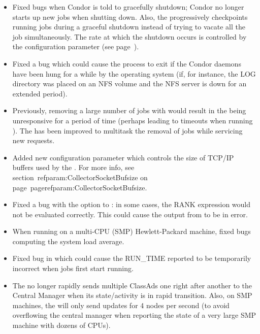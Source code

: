 \begin{itemize}
\item Fixed bugs when Condor is told to gracefully shutdown; Condor no
longer starts up new jobs when shutting down.  Also, the 
progressively checkpoints running jobs during a graceful shutdown instead of
trying to vacate all the job simultaneously.  The rate at which the shutdown
occurs is controlled by the  configuration
parameter (see page~\pageref{param:JobStartDelay}).

\item Fixed a bug which could cause the  process to exit if
the Condor daemons have been hung for a while by the operating system (if,
for instance, the LOG directory was placed on an NFS volume and the NFS
server is down for an extended period).

\item Previously, removing a large number of jobs with  would
result in the  being unresponsive for a period of time
(perhaps leading to timeouts when running ).  The 
has been improved to multitask the removal of jobs while servicing new
requests.

\item Added new configuration parameter 
which controls the size of TCP/IP buffers used by the .
For more info, see section~ref{param:CollectorSocketBufsize} on
page~pageref{param:CollectorSocketBufsize}.

\item Fixed a bug with the  option to : in some
cases, the RANK expression would not be evaluated correctly.  This could
cause the output from  to be in error.

\item When running on a multi-CPU (SMP) Hewlett-Packard machine, fixed bugs
computing the system load average.

\item Fixed bug in  which could cause the RUN\_TIME reported to
be temporarily incorrect when jobs first start running. 

\item The  no longer rapidly sends multiple ClassAds one
right after another to the Central Manager when its state/activity is in
rapid transition.  Also, on SMP machines, the  will only send
updates for 4 nodes per second (to avoid overflowing the central manager when
reporting the state of a very large SMP machine with dozens of CPUs).


\end{itemize}
